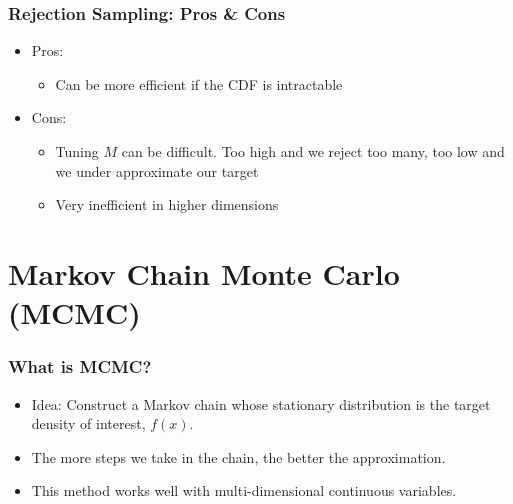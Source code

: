 \documentclass{beamer}
\begin{document}
\begin{frame}
  \frametitle{Rejection Sampling: Pros \& Cons}
  \begin{itemize}
    \item Pros:
    \begin{itemize}
      \item Can be more efficient if the CDF is intractable
    \end{itemize}
    \item Cons:
    \begin{itemize}
      \item Tuning $M$ can be difficult. Too high and we reject too many, too low and
      we under approximate our target
      \item Very inefficient in higher dimensions
    \end{itemize}
  \end{itemize}
\end{frame}


\section{Markov Chain Monte Carlo (MCMC)}
\begin{frame}
\frametitle{What is MCMC?}
\begin{itemize}
  \item Idea: Construct a Markov chain whose stationary distribution is the
  target density of interest, $f(x)$.
  \item The more steps we take in the chain, the better the approximation.
  \item This method works well with multi-dimensional continuous variables.
\end{itemize}
\end{frame}
\end{document}
